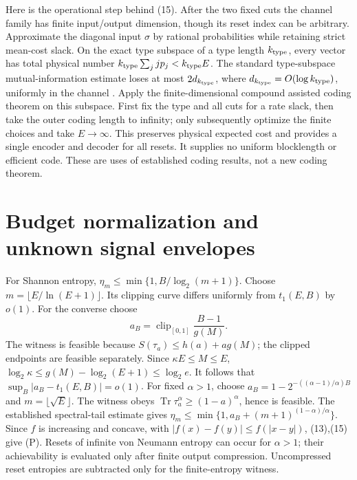 \documentclass[11pt]{article}
\newcommand{\Tr}{\operatorname{Tr}}
\begin{document}
Here is the operational step behind (15).
After the two fixed cuts the channel family has finite input/output
dimension, though its reset index can be arbitrary.
Approximate the diagonal input \(\sigma\) by rational probabilities
while retaining strict mean-cost slack. On the exact type subspace of
a type length \(k_{\rm type}\), every vector has total physical number
\(k_{\rm type}\sum_j jp_j<k_{\rm type}E\).
The standard type-subspace mutual-information estimate loses at most
\(2d_{k_{\rm type}}\), where \(d_{k_{\rm type}}=O(\log k_{\rm type})\),
uniformly in the channel \cite[Lemma~9]{compound}.
Apply the finite-dimensional compound assisted coding theorem
\cite[Theorem~1]{compound} on this subspace. First fix the type and
all cuts for a rate slack, then take the outer coding length to infinity;
only subsequently optimize the finite choices and take \(E\to\infty\).
This preserves physical expected cost and provides a single encoder
and decoder for all resets. It supplies no uniform blocklength or
efficient code. These are uses of established coding results, not
a new coding theorem.

\section{Budget normalization and unknown signal envelopes}
For Shannon entropy,
\(\eta_m\le\min\{1,B/\log_2(m+1)\}\).
Choose \(m=\lfloor E/\ln(E+1)\rfloor\).
Its clipping curve differs uniformly from \(t_1(E,B)\) by \(o(1)\).
For the converse choose
\[
 a_B=\operatorname{clip}_{[0,1]}\frac{B-1}{g(M)}.
\]
The witness is feasible because \(S(\tau_a)\le h(a)+ag(M)\);
the clipped endpoints are feasible separately.
Since \(\kappa E\le M\le E\),
\(\log_2\kappa\le g(M)-\log_2(E+1)\le\log_2e\).
It follows that \(\sup_B|a_B-t_1(E,B)|=o(1)\).
For fixed \(\alpha>1\), choose
\(a_B=1-2^{-((\alpha-1)/\alpha)B}\) and \(m=\lfloor\sqrt E\rfloor\).
The witness obeys \(\Tr\tau_a^\alpha\ge(1-a)^\alpha\), hence is feasible.
The established spectral-tail estimate gives
\(\eta_m\le\min\{1,a_B+(m+1)^{(1-\alpha)/\alpha}\}\).
Since \(f\) is increasing and concave, with
\(|f(x)-f(y)|\le f(|x-y|)\), (13),(15) give (P).
Resets of infinite von Neumann entropy can occur for \(\alpha>1\);
their achievability is evaluated only after finite output compression.
Uncompressed reset entropies are subtracted only for the finite-entropy
witness.
\end{document}
